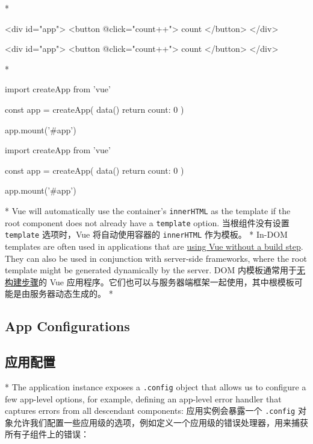 \begin{paracol}{2}
\switchcolumn[0]*%
\begin{codeHtml}
<div id="app">
<button @click="count++">{{ count }}</button>
</div>
\end{codeHtml}
\switchcolumn
\begin{codeHtml}
<div id="app">
<button @click="count++">{{ count }}</button>
</div>
\end{codeHtml}


\switchcolumn[0]*%
\begin{codeJs}
import { createApp } from 'vue'

const app = createApp({
    data() {
    return {
        count: 0
    }
    }
})

app.mount('#app')
\end{codeJs}
\switchcolumn
\begin{codeJs}
import { createApp } from 'vue'

const app = createApp({
    data() {
    return {
        count: 0
    }
    }
})

app.mount('#app')
\end{codeJs}


\switchcolumn[0]*%
Vue will automatically use the container's \texttt{innerHTML} as the
template if the root component does not already have a \texttt{template}
option.
\switchcolumn
当根组件没有设置 \texttt{template} 选项时，Vue 将自动使用容器的
\texttt{innerHTML} 作为模板。
\switchcolumn[0]*%
In-DOM templates are often used in applications that are
\href{https://vuejs.org/guide/quick-start.html\#using-vue-from-cdn}{using
Vue without a build step}. They can also be used in conjunction with
server-side frameworks, where the root template might be generated
dynamically by the server.
\switchcolumn
DOM
内模板通常用于\href{https://cn.vuejs.org/guide/quick-start.html\#using-vue-from-cdn}{无构建步骤}的
Vue
应用程序。它们也可以与服务器端框架一起使用，其中根模板可能是由服务器动态生成的。
\switchcolumn[0]*%
\subsection{App Configurations}
\switchcolumn
\subsection{应用配置}
\switchcolumn[0]*%
The application instance exposes a \texttt{.config} object that allows
us to configure a few app-level options, for example, defining an
app-level error handler that captures errors from all descendant
components:
\switchcolumn
应用实例会暴露一个 \texttt{.config}
对象允许我们配置一些应用级的选项，例如定义一个应用级的错误处理器，用来捕获所有子组件上的错误：
\end{paracol}
